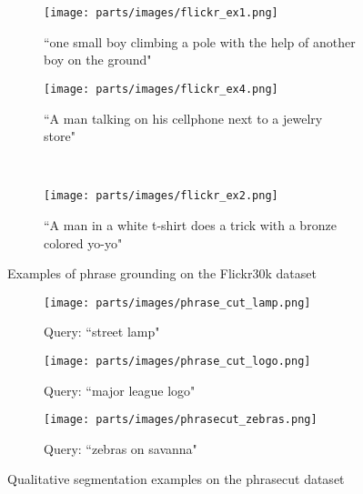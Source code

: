 \begin{figure*}[h]
    \centering
    \begin{subfigure}[t]{0.2\textwidth}
        \centering
        \texttt{[image: parts/images/flickr\_ex1.png]}
        \caption{``one small boy climbing a pole with the help of another boy on the ground"}
    \end{subfigure}\hspace{2mm}
    \begin{subfigure}[t]{0.3\textwidth}
        \centering
        \texttt{[image: parts/images/flickr\_ex4.png]}
        \caption{``A man talking on his cellphone next to a jewelry store"}
    \end{subfigure} \\
    \begin{subfigure}[t]{\textwidth}
        \centering
        \texttt{[image: parts/images/flickr\_ex2.png]}
        \caption{``A man in a white t-shirt does a trick with a bronze colored yo-yo"}
    \end{subfigure}
    \caption{Examples of phrase grounding on the Flickr30k dataset}
    \label{fig:flickr_examples}
\end{figure*}




\begin{figure*}[t!]
    \centering
    \begin{subfigure}[t]{0.33\textwidth}
        \centering
        \texttt{[image: parts/images/phrase\_cut\_lamp.png]}
        \caption{Query: ``street lamp"}
    \end{subfigure}\begin{subfigure}[t]{0.33\textwidth}
        \centering
        \texttt{[image: parts/images/phrase\_cut\_logo.png]}
        \caption{Query: ``major league logo"}
    \end{subfigure} 
    \begin{subfigure}[t]{0.33\textwidth}
        \centering
        \texttt{[image: parts/images/phrasecut\_zebras.png]}
        \caption{Query: ``zebras on savanna"}
    \end{subfigure}
    \caption{Qualitative segmentation examples on the phrasecut dataset
    \label{fig:phrasecut_examples}}
\end{figure*}

